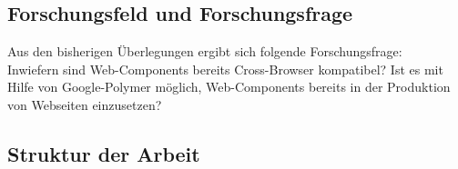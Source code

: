 
\subsection{Forschungsfeld und Forschungsfrage}
\label{sec:1_Forschungsfrage}

Aus den bisherigen Überlegungen ergibt sich folgende Forschungsfrage:\\
Inwiefern sind Web-Components bereits Cross-Browser kompatibel? Ist es mit Hilfe von Google-Polymer möglich, Web-Components bereits in der Produktion von Webseiten einzusetzen?


\subsection{Struktur der Arbeit}
\label{sec:1_Struktur}

